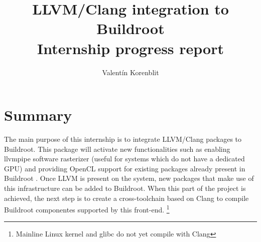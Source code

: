 \documentclass[12pt,a4paper,oneside]{article}
\date{\displaydate{date}}
\begin{document}
\author{Valent\'{i}n Korenblit}
\title{\vspace{-2cm} LLVM/Clang integration to Buildroot
\\ Internship progress report}
\maketitle

\section*{Summary}
The main purpose of this internship is to integrate LLVM/Clang packages to Buildroot.
This package will activate new functionalities such as enabling llvmpipe software
rasterizer (useful for systems which do not have a dedicated GPU) and providing OpenCL
support for existing packages already present in Buildroot . Once LLVM is present
on the system, new packages that make use of this infrastructure can be added to
Buildroot. When this part of the project is achieved, the next step is to create
a cross-toolchain based on Clang to compile Buildroot componentes supported by
this front-end. \footnote{Mainline Linux kernel and glibc do not yet compile with
Clang}
\end{document}

